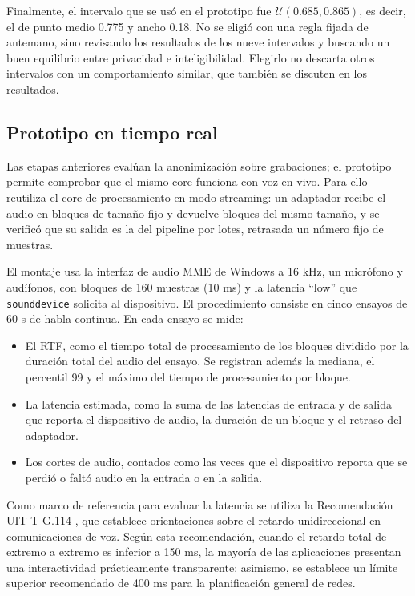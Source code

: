 \documentclass[10pt,twocolumn]{article}
\newcommand{\parencite}[1]{\citep{#1}}
\begin{document}
Finalmente, el intervalo que se usó en el prototipo fue $\mathcal{U}(0.685,0.865)$, es decir, el de punto medio 0.775 y ancho 0.18. No se eligió con una regla fijada de antemano, sino revisando los resultados de los nueve intervalos y buscando un buen equilibrio entre privacidad e inteligibilidad. Elegirlo no descarta otros intervalos con un comportamiento similar, que también se discuten en los resultados.

\subsection{Prototipo en tiempo real}\label{sec:3.7}

Las etapas anteriores evalúan la anonimización sobre grabaciones; el prototipo permite comprobar que el mismo core funciona con voz en vivo. Para ello reutiliza el core de procesamiento en modo streaming: un adaptador recibe el audio en bloques de tamaño fijo y devuelve bloques del mismo tamaño, y se verificó que su salida es la del pipeline por lotes, retrasada un número fijo de muestras.

El montaje usa la interfaz de audio MME de Windows a 16 kHz, un micrófono y audífonos, con bloques de 160 muestras (10 ms) y la latencia ``low'' que \texttt{sounddevice} solicita al dispositivo. El procedimiento consiste en cinco ensayos de 60 s de habla continua. En cada ensayo se mide:

\begin{itemize}
\item El RTF, como el tiempo total de procesamiento de los bloques dividido por la duración total del audio del ensayo. Se registran además la mediana, el percentil 99 y el máximo del tiempo de procesamiento por bloque.
\item La latencia estimada, como la suma de las latencias de entrada y de salida que reporta el dispositivo de audio, la duración de un bloque y el retraso del adaptador.
\item Los cortes de audio, contados como las veces que el dispositivo reporta que se perdió o faltó audio en la entrada o en la salida.
\end{itemize}

Como marco de referencia para evaluar la latencia se utiliza la Recomendación UIT-T G.114 \parencite{ituG114}, que establece orientaciones sobre el retardo unidireccional en comunicaciones de voz. Según esta recomendación, cuando el retardo total de extremo a extremo es inferior a 150 ms, la mayoría de las aplicaciones presentan una interactividad prácticamente transparente; asimismo, se establece un límite superior recomendado de 400 ms para la planificación general de redes.
\end{document}
